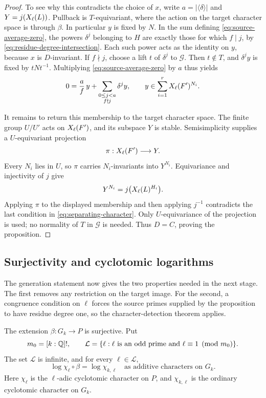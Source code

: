 \begin{proof}
To see why this contradicts the choice of $x$, write
$a=|\langle\delta\rangle|$ and $Y=j(X_{\ell}(L))$.
Pullback is $T$-equivariant, where the action on the target
character space is through $\beta$. In particular $y$ is fixed
by $N$. In the sum defining \eqref{eq:source-average-zero}, the
powers $\delta^j$ belonging to $H$ are exactly those for which
$f\mid j$, by \eqref{eq:residue-degree-intersection}. Each such
power acts as the identity on $y$, because $x$ is $D$-invariant.
If $f\nmid j$, choose a lift $t$ of $\delta^j$ to $\mathcal G$.
Then $t\notin T$, and $\delta^jy$ is fixed by $tNt^{-1}$.
Multiplying \eqref{eq:source-average-zero} by $a$ thus yields
\[
  0=\frac af\,y+\sum_{\substack{0\leq j<a\\f\nmid j}}\delta^jy,
  \qquad
  y\in\sum_{i=1}^rX_{\ell}(F')^{N_i}.
\]

It remains to return this membership to the target character
space. The finite group $U/U'$ acts on $X_{\ell}(F')$, and its
subspace $Y$ is stable. Semisimplicity supplies a $U$-equivariant
projection
\[
  \pi:X_{\ell}(F')\longrightarrow Y.
\]
Every $N_i$ lies in $U$, so $\pi$ carries $N_i$-invariants into
$Y^{N_i}$. Equivariance and injectivity of $j$ give
\[
 Y^{N_i}=j\bigl(X_{\ell}(L)^{H_i}\bigr).
\]
Applying $\pi$ to the displayed membership and then applying
$j^{-1}$ contradicts the last condition in
\eqref{eq:separating-character}. Only $U$-equivariance of the
projection is used; no normality of $T$ in $\mathcal G$ is needed.
Thus $D=C$, proving the proposition.
\end{proof}

\subsection{Surjectivity and cyclotomic logarithms}

The generation statement now gives the two properties needed in the
next stage. The first removes any restriction on the target image.
For the second, a congruence condition on $\ell$ forces the source
primes supplied by the proposition to have residue degree one, so
the character-detection theorem applies.

\begin{theorem}\label{thm:normalized-map}
The extension $\beta:G_k\to P$ is surjective. Put
\[
 m_0=[k:\mathbb Q]!,\qquad
 \mathcal L=\{\ell:\ell\text{ is an odd prime and }
                    \ell\equiv1\pmod{m_0}\}.
\]
The set $\mathcal L$ is infinite, and for every $\ell\in\mathcal L$,
\begin{equation}\label{eq:cyclotomic-logarithms}
 \log\chi_\ell\circ\beta=\log\chi_{k,\ell}
 \quad\text{as additive characters on }G_k.
\end{equation}
Here $\chi_\ell$ is the $\ell$-adic cyclotomic character on $P$,
and $\chi_{k,\ell}$ is the ordinary cyclotomic character on $G_k$.
\end{theorem}

